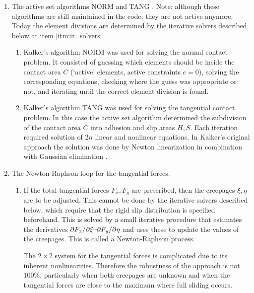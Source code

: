 \documentclass[12pt]{report}
\begin{document}
\begin{enumerate}
\item The active set algorithms NORM and TANG \cite{Kalker1990}. Note:
although these algorithms are still maintained in the code, they are not
active anymore. Today the element divisions are determined by the iterative
solvers described below at item \ref{itm:it_solvers}.
\begin{enumerate}
\item Kalker's algorithm NORM was used for solving the normal contact
        problem. It consisted of guessing which elements should be inside
        the contact area $C$ (`active' elements, active constraints
        $e=0$), solving the corresponding equations, checking where the
        guess was appropriate or not, and iterating until the
        correct element division is found.
\item Kalker's algorithm TANG was used for solving the tangential contact
        problem. In this case the active set algorithm determined the
        subdivision of the contact area $C$ into adhesion and slip areas
        $H, S$. Each iteration required solution of $2n$ linear and nonlinear
        equations. In Kalker's original approach the solution was done by
        Newton linearization in combination with Gaussian elimination
        \cite{Kalker1990}.
\end{enumerate}

\item The Newton-Raphson loop for the tangential forces.
\begin{enumerate}
\item If the total tangential forces $F_x, F_y$ are prescribed, then
        the creepages $\xi,\eta$ are to be adjusted. This cannot be done
        by the iterative solvers described below, which require that the
        rigid slip distribution is specified beforehand. This is solved by
        a small iterative procedure that estimates the derivatives
        $\partial F_x/\partial \xi\text{--}\partial F_y/\partial \eta$ and uses these to
        update the values of the creepages. This is called a
        Newton-Raphson process.

        The $2\times 2$ system for the tangential forces is complicated due
        to its inherent nonlinearities. Therefore the robustness of the
        approach is not 100\%, particularly when both creepages are
        unknown and when the tangential forces are close to the maximum
        where full sliding occurs.
\end{enumerate}


\end{enumerate}
\end{document}
